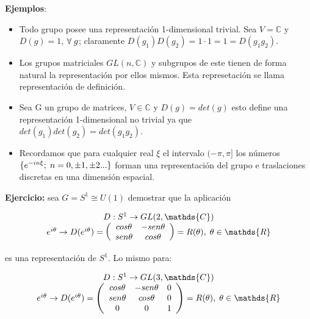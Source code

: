 \documentclass{article}
\begin{document}
\textbf{Ejemplos}:

\begin{itemize}
    \item Todo grupo posee una representación 1-dimensional trivial. Sea $V=\mathds{C}$ y $D(g)=1$, $\forall \hspace{0.1cm} g$; claramente $D(g_1)D(g_2)=1\cdot 1=1=D(g_1g_2)$.
    \item Los grupos matriciales $GL(n,\mathds{C})$ y subgrupos de este tienen de forma natural la representación por ellos mismos. Esta represetación se llama representación de definición. 
    \item Sea G un grupo de matrices, $V\in \mathds{C}$ y $D(g)=det(g)$ esto define una representación 1-dimensional no trivial ya que $det(g_1)det(g_2)=det(g_1g_2)$.
    \item Recordamos que para cualquier real $\xi$ el intervalo $(-\pi, \pi]$ los números $\lbrace e^{-in\xi}; \hspace{0.1cm} n=0,\pm 1, \pm 2... \rbrace$ forman una representación del grupo e traslaciones discretas en una dimensión espacial.
\end{itemize}

 \smallskip
    \textbf{Ejercicio:} sea $G=S^1 \cong U(1)$ demostrar que la aplicación 
    
    $$\begin{array}{cc}
         D: S^1 \to GL(2,\mathds{C})  \\
         e^{i\theta} \to D(e^{i\theta})= \left (\begin{array}{cc}
           cos \theta   & -sen \theta  \\
           sen \theta   & cos \theta
         \end{array} \right )=R( \theta), \hspace{0.1cm} \theta \in \mathds{R}
    \end{array}$$
    
    es una representación de $S^1$. Lo mismo para:
    
     $$\begin{array}{cc}
         D: S^1 \to GL(3,\mathds{C})  \\
         e^{i\theta} \to D(e^{i\theta})= \left (\begin{array}{ccc}
           cos \theta   & -sen \theta  & 0\\
           sen \theta   & cos \theta & 0 \\
           0 & 0 & 1
         \end{array} \right )=R( \theta), \hspace{0.1cm} \theta \in \mathds{R}
    \end{array}$$
    
\end{document}
